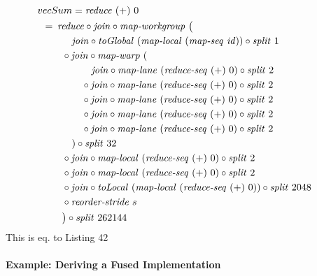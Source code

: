 \begin{align}
  &\hspace{-1.5em}vecSum = \reduce\ (+)\ 0\nonumber\\
  &\hspace{-2em}\quad\begin{aligned}
    &=\hspace{.2em}
      \reduce \circ \join \circ \mapWorkgroup\ \big(\\
      &\qquad\ \ \ \join \circ \toGlobal\ (\mapLocal\ (\mapSeq\ \id)) \circ \splitN\ 1\\
      &\qquad \circ \join \circ \mapWarp\ (\\
      &\qquad\qquad\ \ \ \join \circ \mapLane\ (\reduceSeq\ (+)\ 0) \circ \splitN\ 2\\
      &\qquad\qquad \circ \join \circ \mapLane\ (\reduceSeq\ (+)\ 0) \circ \splitN\ 2\\
      &\qquad\qquad \circ \join \circ \mapLane\ (\reduceSeq\ (+)\ 0) \circ \splitN\ 2\\
      &\qquad\qquad \circ \join \circ \mapLane\ (\reduceSeq\ (+)\ 0) \circ \splitN\ 2\\
      &\qquad\qquad \circ \join \circ \mapLane\ (\reduceSeq\ (+)\ 0) \circ \splitN\ 2\\
      &\qquad\quad) \circ \splitN\ 32\\
      &\qquad \circ \join \circ \mapLocal\ (\reduceSeq\ (+)\ 0) \circ \splitN\ 2\\
      &\qquad \circ \join \circ \mapLocal\ (\reduceSeq\ (+)\ 0) \circ \splitN\ 2\\
      &\qquad \circ \join \circ \toLocal\ (\mapLocal\ (\reduceSeq\ (+)\ 0)) \circ \splitN\ 2048\\
      &\qquad \circ \reorderStride\ s\\
      &\qquad\big) \circ \splitN\ 262144
  \end{aligned}
\end{align}
This is eq. to Listing 42

\paragraph{Example: Deriving a Fused Implementation}

